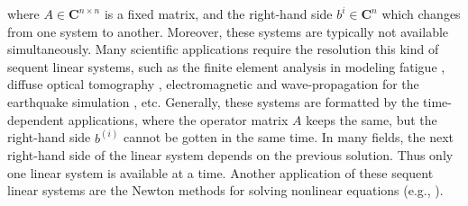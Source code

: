 where $A \in \mathbf{C}^{n\times n}$ is a fixed matrix, and the right-hand side $b^{i} \in \mathbf{C}^n$ which changes from one system to another. Moreover, these systems are typically not available simultaneously. Many scientific applications require the resolution this kind of sequent linear systems, such as the finite element analysis in modeling fatigue \cite{newman1976finite, gullerud2001mpi,sukumar2003extended}, diffuse optical tomography \cite{kilmer2006recycling,arridge1993finite,schweiger1995finite}, electromagnetic \cite{bastos2003electromagnetic,pridmore1981investigation, ye2008generalized} and wave-propagation for the earthquake simulation \cite{Fujita:2018:WPS:3149457.3149474,moczo2007finite,chen2015transient}, etc. Generally, these systems are formatted by the time-dependent applications, where the operator matrix $A$ keeps the same, but the right-hand side $b^{(i)}$ cannot be gotten in the same time. In many fields, the next right-hand side of the linear system depends on the previous solution. Thus only one linear system is available at a time. Another application of these sequent linear systems are the Newton methods for solving nonlinear equations (e.g., \cite{brown1990hybrid,knoll2004jacobian,bellavia2001globally,flueck1998solving,an2007globally}). 

